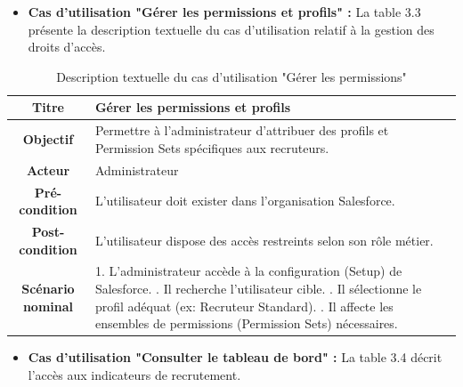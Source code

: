 \begin{itemize}
        \item \textbf{Cas d'utilisation "Gérer les permissions et profils" :} La table 3.3 présente la description textuelle du cas d'utilisation relatif à la gestion des droits d'accès.
    \end{itemize}
    \begin{table}[H]
    \caption{Description textuelle du cas d’utilisation "Gérer les permissions"}
    \centering
    \begin{tabular}{|c|p{12cm}|}
    \hline
    \textbf{Titre} & Gérer les permissions et profils \\
    \hline
    \textbf{Objectif} & Permettre à l’administrateur d’attribuer des profils et Permission Sets spécifiques aux recruteurs. \\
    \hline
    \textbf{Acteur}& Administrateur\\
    \hline
    \textbf{Pré-condition} & L'utilisateur doit exister dans l'organisation Salesforce. \\
    \hline
    \textbf{Post-condition} & L'utilisateur dispose des accès restreints selon son rôle métier.\\
    \hline
    \textbf{Scénario nominal} & 1. L’administrateur accède à la configuration (Setup) de Salesforce. \newline
    2. Il recherche l'utilisateur cible. \newline
    3. Il sélectionne le profil adéquat (ex: Recruteur Standard). \newline
    4. Il affecte les ensembles de permissions (Permission Sets) nécessaires. \\
    \hline
    \end{tabular}
    \label{tab:uc_permissions}
\end{table}
\begin{itemize}
        \item \textbf{Cas d'utilisation "Consulter le tableau de bord" :} La table 3.4 décrit l'accès aux indicateurs de recrutement.
    \end{itemize}

